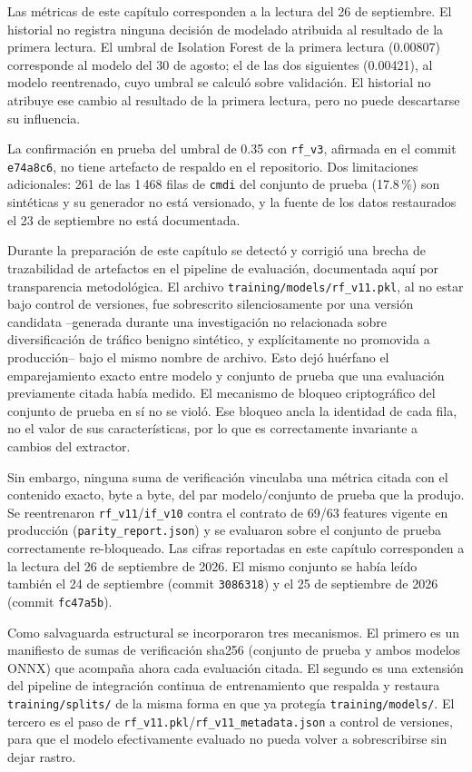 Las métricas de este capítulo corresponden a la lectura del 26 de septiembre. El historial no registra ninguna decisión de modelado atribuida al resultado de la primera lectura. El umbral de Isolation Forest de la primera lectura (0.00807) corresponde al modelo del 30 de agosto; el de las dos siguientes (0.00421), al modelo reentrenado, cuyo umbral se calculó sobre validación. El historial no atribuye ese cambio al resultado de la primera lectura, pero no puede descartarse su influencia.

La confirmación en prueba del umbral de 0.35 con \texttt{rf\_v3}, afirmada en el commit \texttt{e74a8c6}, no tiene artefacto de respaldo en el repositorio. Dos limitaciones adicionales: 261 de las 1\,468 filas de \texttt{cmdi} del conjunto de prueba (17.8\,\%) son sintéticas y su generador no está versionado, y la fuente de los datos restaurados el 23 de septiembre no está documentada.

Durante la preparación de este capítulo se detectó y corrigió una brecha de trazabilidad de artefactos en el pipeline de evaluación, documentada aquí por transparencia metodológica. El archivo \texttt{training/models/rf\_v11.pkl}, al no estar bajo control de versiones, fue sobrescrito silenciosamente por una versión candidata --generada durante una investigación no relacionada sobre diversificación de tráfico benigno sintético, y explícitamente no promovida a producción-- bajo el mismo nombre de archivo. Esto dejó huérfano el emparejamiento exacto entre modelo y conjunto de prueba que una evaluación previamente citada había medido. El mecanismo de bloqueo criptográfico del conjunto de prueba en sí no se violó. Ese bloqueo ancla la identidad de cada fila, no el valor de sus características, por lo que es correctamente invariante a cambios del extractor.

Sin embargo, ninguna suma de verificación vinculaba una métrica citada con el contenido exacto, byte a byte, del par modelo/conjunto de prueba que la produjo. Se reentrenaron \texttt{rf\_v11}/\texttt{if\_v10} contra el contrato de 69/63 features vigente en producción (\texttt{parity\_report.json}) y se evaluaron sobre el conjunto de prueba correctamente re-bloqueado. Las cifras reportadas en este capítulo corresponden a la lectura del 26 de septiembre de 2026. El mismo conjunto se había leído también el 24 de septiembre (commit \texttt{3086318}) y el 25 de septiembre de 2026 (commit \texttt{fc47a5b}).

Como salvaguarda estructural se incorporaron tres mecanismos. El primero es un manifiesto de sumas de verificación sha256 (conjunto de prueba y ambos modelos ONNX) que acompaña ahora cada evaluación citada. El segundo es una extensión del pipeline de integración continua de entrenamiento que respalda y restaura \texttt{training/splits/} de la misma forma en que ya protegía \texttt{training/models/}. El tercero es el paso de \texttt{rf\_v11.pkl}/\texttt{rf\_v11\_metadata.json} a control de versiones, para que el modelo efectivamente evaluado no pueda volver a sobrescribirse sin dejar rastro.

